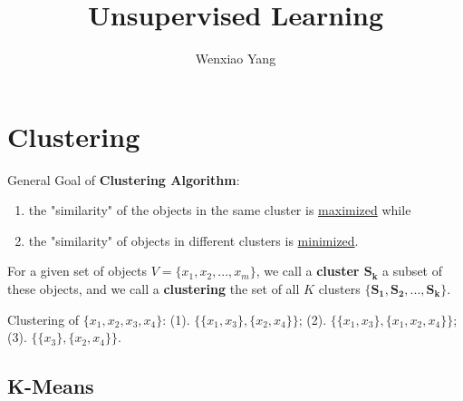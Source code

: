\documentclass[11pt]{elegantbook}
\title{\textbf{Unsupervised Learning}}
\author{Wenxiao Yang}
\institute{Department of Mathematics, University of Illinois at Urbana-Champaign}
\date{}
\begin{document}
\maketitle
\frontmatter
\tableofcontents
\mainmatter

\chapter{Clustering}
General Goal of \textbf{Clustering Algorithm}:
\begin{enumerate}[$\circ$]
    \item the "similarity" of the objects in the same cluster is \underline{maximized} while
    \item the "similarity" of objects in different clusters is \underline{minimized}.
\end{enumerate}

\begin{definition}
    For a given set of objects $V = \{x_1, x_2, ... , x_m\}$, we call a \textbf{cluster $\mathbf{S_k}$} a subset of these objects, and we call a \textbf{clustering} the set of all $K$ clusters $\mathbf{\{S_1 ,S_2 , ... , S_k\}}$.
\end{definition}
\begin{example}
    Clustering of $\{x_1,x_2,x_3,x_4\}$: (1). $\{\{x_1,x_3\},\{x_2,x_4\}\}$; (2). $\{\{x_1,x_3\},\{x_1,x_2,x_4\}\}$; (3). $\{\{x_3\},\{x_2,x_4\}\}$.
\end{example}

\section{K-Means}
\end{document}
